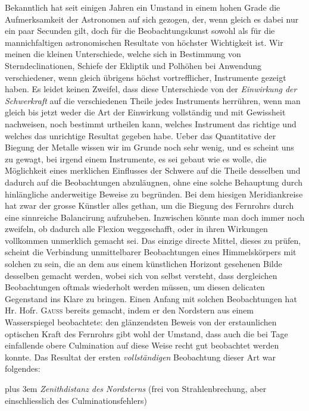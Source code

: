 Bekanntlich hat seit einigen Jahren ein Umstand in einem hohen Grade die Aufmerksamkeit der
Astronomen auf sich gezogen, der, wenn gleich es dabei nur ein paar Secunden gilt, doch für die
Beobachtungskunst sowohl als für die mannichfaltigen astronomischen Resultate von höchster
Wichtigkeit ist. Wir meinen die kleinen Unterschiede, welche sich in Bestimmung von
Sterndeclinationen, Schiefe der Ekliptik und Polhöhen bei Anwendung verschiedener, wenn gleich
übrigens höchst vortrefflicher, Instrumente gezeigt haben. Es leidet keinen Zweifel, dass diese
Unterschiede von der \emph{Einwirkung der Schwerkraft} auf die verschiedenen Theile jedes
Instruments herrühren, wenn man gleich bis 
jetzt weder die Art der Einwirkung vollständig und mit Gewissheit nachweisen, noch bestimmt
urtheilen kann, welches Instrument das richtige und welches das unrichtige Resultat gegeben habe.
Ueber das Quantitative der Biegung der Metalle wissen wir im Grunde noch sehr wenig, und es scheint
uns zu gewagt, bei irgend einem Instrumente, es sei gebaut wie es wolle, die Möglichkeit eines
merklichen Einflusses der Schwere auf die Theile desselben und dadurch auf die Beobachtungen
abzuläugnen, ohne eine solche Behauptung durch hinlängliche anderweitige Beweise zu begründen. Bei
dem hiesigen Meridiankreise hat zwar der grosse Künstler alles gethan, um die Biegung des Fernrohrs
durch eine sinnreiche Balancirung aufzuheben. Inzwischen könnte man doch immer noch zweifeln, ob
dadurch alle Flexion weggeschafft, oder in ihren Wirkungen vollkommen unmerklich gemacht sei. Das
einzige directe Mittel, dieses zu prüfen, scheint die Verbindung unmittelbarer Beobachtungen eines
Himmelskörpers mit solchen zu sein, die an dem aus einem künstlichen Horizont gesehenen Bilde
desselben gemacht werden, wobei sich von selbst versteht, dass dergleichen Beobachtungen oftmals
wiederholt werden müssen, um diesen delicaten Gegenstand ins Klare zu bringen. Einen Anfang mit
solchen Beobachtungen hat Hr. Hofr. \textsc{Gauss} bereits gemacht, indem er den Nordstern aus
einem Wasserspiegel beobachtete: den glänzendsten Beweis von der erstaunlichen optischen Kraft des
Fernrohrs gibt wohl der Umstand, dass auch die bei Tage einfallende obere Culmination auf diese
Weise recht gut beobachtet werden konnte. Das Resultat der ersten \textit{vollständigen}
Beobachtung dieser Art war folgendes:

{\rightskip=0pt plus 3em \textit{Zenithdistanz des Nordsterns} (frei von Strahlenbrechung, aber einschliesslich des
Culminationsfehlers)\par}

